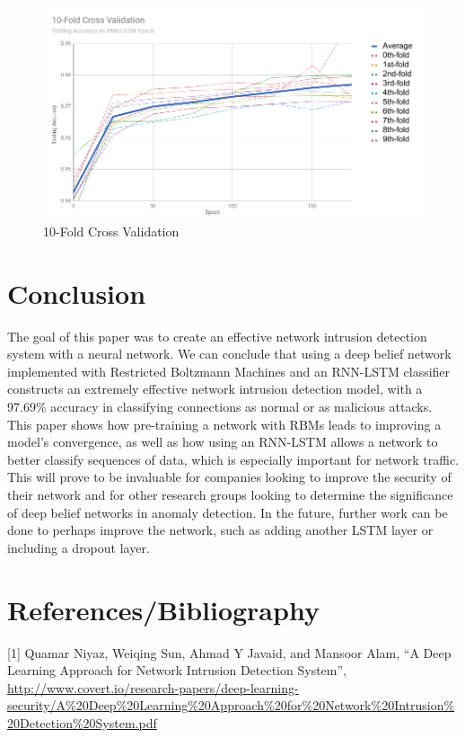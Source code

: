 \documentclass[a4paper]{article}
\begin{document}
\begin{center}
\begin{tabular}{||p{2cm}|p{2cm}|p{2cm}|p{2cm}|p{2cm}|p{2cm}|p{2.5cm}||}
\end{tabular}
\pagebreak
\begin{figure}[h]
\centering
\hspace*{-5mm}\includegraphics[width=7in]{10fold}\caption{10-Fold Cross Validation}\label{fig:XSS}
\end{figure}
\end{center}
\section{Conclusion}
\hspace*{10mm}
The goal of this paper was to create an effective network intrusion detection system with a neural network. We can conclude that using a deep belief network implemented with Restricted Boltzmann Machines and an RNN-LSTM classifier constructs an extremely effective network intrusion detection model, with a 97.69\% accuracy in classifying connections as normal or as malicious attacks. This paper shows how pre-training a network with RBMs leads to improving a model's convergence, as well as how using an RNN-LSTM allows a network to better classify sequences of data, which is especially important for network traffic. This will prove to be invaluable for companies looking to improve the security of their network and for other research groups looking to determine the significance of deep belief networks in anomaly detection. In the future, further work can be done to perhaps improve the network, such as adding another LSTM layer or including a dropout layer.


\section{References/Bibliography}
\hspace*{5mm}[1] Quamar Niyaz, Weiqing Sun, Ahmad Y Javaid, and Mansoor Alam, “A Deep Learning Approach for Network Intrusion Detection System”, \url{http://www.covert.io/research-papers/deep-learning-security/A%20Deep%20Learning%20Approach%20for%20Network%20Intrusion%20Detection%20System.pdf}
\end{document}
